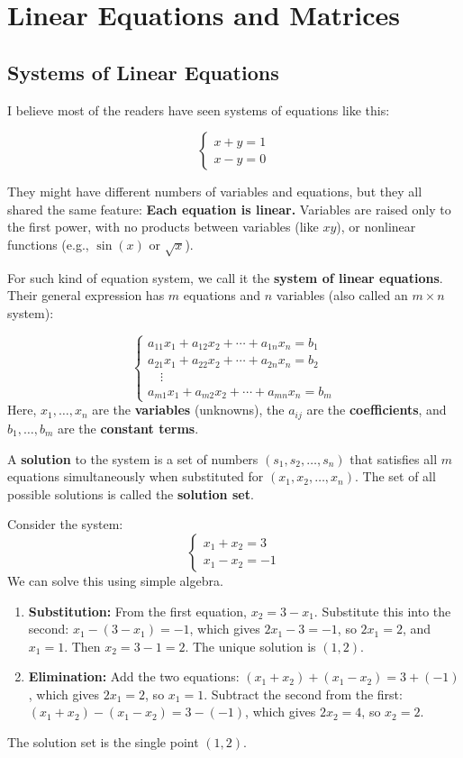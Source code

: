 \documentclass[oneside]{book}
\begin{document}
\section{Linear Equations and Matrices}

\subsection{Systems of Linear Equations}

I believe most of the readers have seen systems of equations like this:

\[
\begin{cases}
x+y=1\\
x-y =0
\end{cases}
\]

They might have different numbers of variables and equations, but they all shared the same feature: \textbf{Each equation is linear.} Variables are raised only to the first power, with no products between variables (like $xy$), or nonlinear functions (e.g., $\sin(x)$ or $\sqrt{x}$).

For such kind of equation system, we call it the \textbf{system of linear equations}. Their general expression has $m$ equations and $n$ variables (also called an $m \times n$ system):

\[
\begin{cases}
a_{11}x_1 + a_{12}x_2 + \cdots + a_{1n}x_n = b_1\\
a_{21}x_1 + a_{22}x_2 + \cdots + a_{2n}x_n = b_2\\
\quad \vdots \\
a_{m1}x_1 + a_{m2}x_2 + \cdots + a_{mn}x_n = b_m
\end{cases}
\]
Here, $x_1, \ldots, x_n$ are the \textbf{variables} (unknowns), the $a_{ij}$ are the \textbf{coefficients}, and $b_1, \ldots, b_m$ are the \textbf{constant terms}.

A \textbf{solution} to the system is a set of numbers $(s_1, s_2, \ldots, s_n)$ that satisfies all $m$ equations simultaneously when substituted for $(x_1, x_2, \ldots, x_n)$. The set of all possible solutions is called the \textbf{solution set}.

\begin{example}[A 2x2 System]
Consider the system:
\[
\begin{cases}
x_1 + x_2 = 3 \\
x_1 - x_2 = -1
\end{cases}
\]
We can solve this using simple algebra.
\begin{enumerate}
    \item \textbf{Substitution:} From the first equation, $x_2 = 3 - x_1$. Substitute this into the second: $x_1 - (3 - x_1) = -1$, which gives $2x_1 - 3 = -1$, so $2x_1 = 2$, and $x_1 = 1$. Then $x_2 = 3 - 1 = 2$. The unique solution is $(1, 2)$.
    \item \textbf{Elimination:} Add the two equations: $(x_1 + x_2) + (x_1 - x_2) = 3 + (-1)$, which gives $2x_1 = 2$, so $x_1 = 1$. Subtract the second from the first: $(x_1 + x_2) - (x_1 - x_2) = 3 - (-1)$, which gives $2x_2 = 4$, so $x_2 = 2$.
\end{enumerate}
The solution set is the single point $(1, 2)$.
\end{example}
\end{document}
